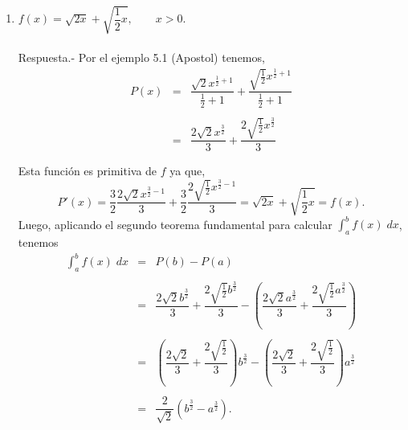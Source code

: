 \begin{enumerate}[\bfseries 1.]
    \item $f(x)=\sqrt{2x}+\sqrt{\dfrac{1}{2}x},\qquad x>0$.\\\\
	Respuesta.-\; Por el ejemplo 5.1 (Apostol) tenemos, 
	$$\begin{array}{rcl}
	    P(x)&=&\dfrac{\sqrt{2}x^{\frac{1}{2}+1}}{\frac{1}{2}+1}+\dfrac{\sqrt{\frac{1}{2}}x^{\frac{1}{2}+1}}{\frac{1}{2}+1}\\\\
	    		&=&\dfrac{2\sqrt{2}x^{\frac{3}{2}}}{3}+\dfrac{2\sqrt{\frac{1}{2}}x^{\frac{3}{2}}}{3}\\\\
	\end{array}$$
	Esta función es primitiva de $f$ ya que,
	$$P'(x)=\dfrac{3}{2}\dfrac{2\sqrt{2}x^{\frac{3}{2}-1}}{3}+\dfrac{3}{2}\dfrac{2\sqrt{\frac{1}{2}}x^{\frac{3}{2}-1}}{3}=\sqrt{2x}+\sqrt{\dfrac{1}{2}x}=f(x).$$
	Luego, aplicando el segundo teorema fundamental para calcular $\int_a^b f(x)\; dx$, tenemos
	$$\begin{array}{rcl}
	    \displaystyle\int_a^b f(x)\; dx &=& P(b)-P(a)\\\\
					    &=& \dfrac{2\sqrt{2}b^{\frac{3}{2}}}{3}+\dfrac{2\sqrt{\frac{1}{2}}b^{\frac{3}{2}}}{3}-\left(\dfrac{2\sqrt{2}a^{\frac{3}{2}}}{3}+\dfrac{2\sqrt{\frac{1}{2}}a^{\frac{3}{2}}}{3}\right) \\\\
					    &=& \left(\dfrac{2\sqrt{2}}{3}+\dfrac{2\sqrt{\frac{1}{2}}}{3}\right)b^{\frac{3}{2}}-\left(\dfrac{2\sqrt{2}}{3}+\dfrac{2\sqrt{\frac{1}{2}}}{3}\right)a^{\frac{3}{2}}\\\\
					    &=& \dfrac{2}{\sqrt{2}}\left(b^{\frac{3}{2}}-a^{\frac{3}{2}}\right).

	\end{array}$$
	\vspace{.5cm}


\end{enumerate}
